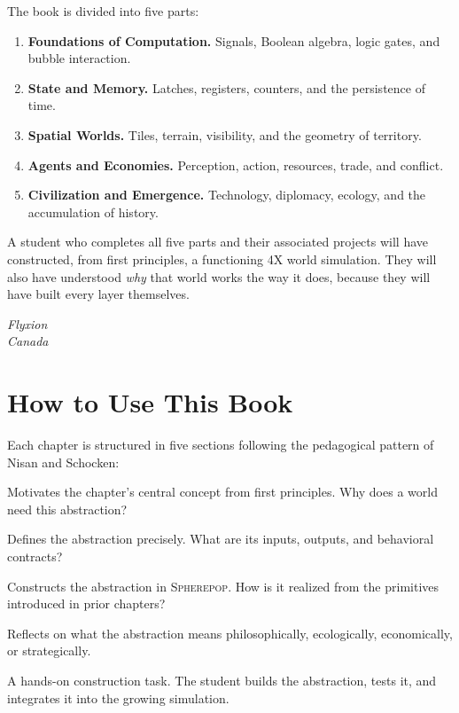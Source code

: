 \documentclass[11pt,a4paper,openany]{book}
\theoremstyle{plain}
\theoremstyle{definition}
\theoremstyle{remark}
\newcommand{\Sp}{\textsc{Spherepop}\xspace}
\begin{document}
The book is divided into five parts:
\begin{enumerate}[leftmargin=*, label=\Roman*.]
  \item \textbf{Foundations of Computation.}
    Signals, Boolean algebra, logic gates, and bubble interaction.
  \item \textbf{State and Memory.}
    Latches, registers, counters, and the persistence of time.
  \item \textbf{Spatial Worlds.}
    Tiles, terrain, visibility, and the geometry of territory.
  \item \textbf{Agents and Economies.}
    Perception, action, resources, trade, and conflict.
  \item \textbf{Civilization and Emergence.}
    Technology, diplomacy, ecology, and the accumulation of history.
\end{enumerate}

A student who completes all five parts and their associated projects will
have constructed, from first principles, a functioning 4X world simulation.
They will also have understood \emph{why} that world works the way it does,
because they will have built every layer themselves.

\bigskip
\noindent\textit{Flyxion}\\
\noindent\textit{Canada}

\chapter*{How to Use This Book}

Each chapter is structured in five sections following the pedagogical
pattern of Nisan and Schocken:

\begin{description}[style=nextline]
  \item[\textcolor{sphereblue}{Background}]
    Motivates the chapter's central concept from first principles.
    Why does a world need this abstraction?

  \item[\textcolor{sphereteal}{Specification}]
    Defines the abstraction precisely. What are its inputs, outputs,
    and behavioral contracts?

  \item[\textcolor{sphereamber!80!black}{Implementation}]
    Constructs the abstraction in \Sp{}. How is it realized
    from the primitives introduced in prior chapters?

  \item[\textcolor{spherered}{Perspective}]
    Reflects on what the abstraction means philosophically, ecologically,
    economically, or strategically.

  \item[\textcolor{sphereblue}{Project}]
    A hands-on construction task. The student builds the abstraction,
    tests it, and integrates it into the growing simulation.
\end{description}
\end{document}
